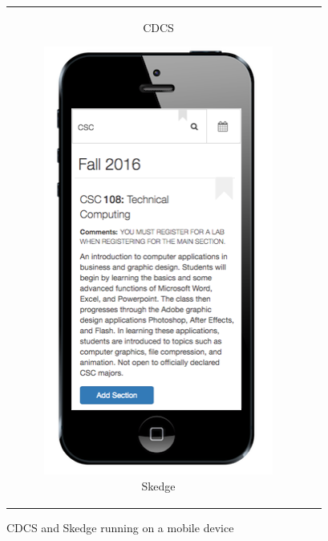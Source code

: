 \begin{figure}[ht]
\begin{tabular}{c c}
\begin{subfigure}[h]{4.5cm}
      \caption{CDCS} \label{fig:cdcs-mobile}
    \end{subfigure}
    \begin{subfigure}[h]{4.4cm}
      \centering
      \includegraphics[width=1.00\textwidth]{images/skedge/mobile}
      \caption{Skedge} \label{fig:sk-mobile}
    \end{subfigure}
  \end{tabular}
  \caption{CDCS and Skedge running on a mobile device}
\end{figure}

